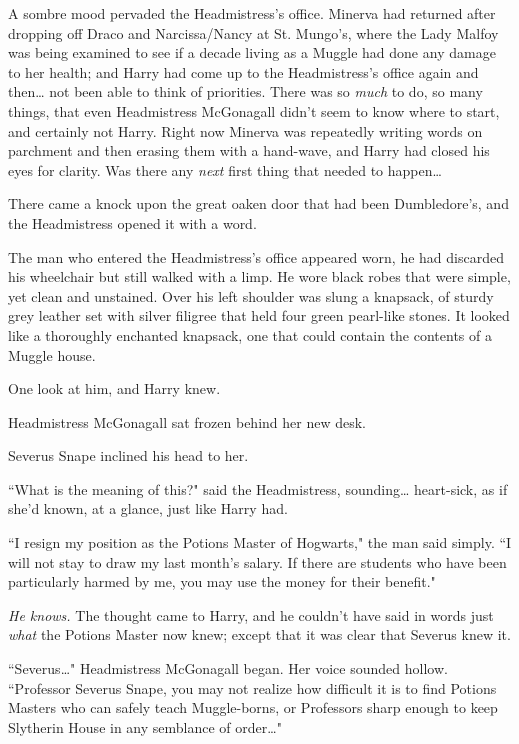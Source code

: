 
\lettrine{A}{} sombre mood pervaded the Headmistress's office. Minerva had returned after dropping off Draco and Narcissa/Nancy at St. Mungo's, where the Lady Malfoy was being examined to see if a decade living as a Muggle had done any damage to her health; and Harry had come up to the Headmistress's office again and then{\ldots} not been able to think of priorities. There was so \emph{much} to do, so many things, that even Headmistress McGonagall didn't seem to know where to start, and certainly not Harry. Right now Minerva was repeatedly writing words on parchment and then erasing them with a hand-wave, and Harry had closed his eyes for clarity. Was there any \emph{next} first thing that needed to happen{\ldots}

There came a knock upon the great oaken door that had been Dumbledore's, and the Headmistress opened it with a word.

The man who entered the Headmistress's office appeared worn, he had discarded his wheelchair but still walked with a limp. He wore black robes that were simple, yet clean and unstained. Over his left shoulder was slung a knapsack, of sturdy grey leather set with silver filigree that held four green pearl-like stones. It looked like a thoroughly enchanted knapsack, one that could contain the contents of a Muggle house.

One look at him, and Harry knew.

Headmistress McGonagall sat frozen behind her new desk.

Severus Snape inclined his head to her.

``What is the meaning of this?" said the Headmistress, sounding{\ldots} heart-sick, as if she'd known, at a glance, just like Harry had.

``I resign my position as the Potions Master of Hogwarts," the man said simply. ``I will not stay to draw my last month's salary. If there are students who have been particularly harmed by me, you may use the money for their benefit."

\emph{He knows.} The thought came to Harry, and he couldn't have said in words just \emph{what} the Potions Master now knew; except that it was clear that Severus knew it.

``Severus{\ldots}" Headmistress McGonagall began. Her voice sounded hollow. ``Professor Severus Snape, you may not realize how difficult it is to find Potions Masters who can safely teach Muggle-borns, or Professors sharp enough to keep Slytherin House in any semblance of order{\ldots}"

